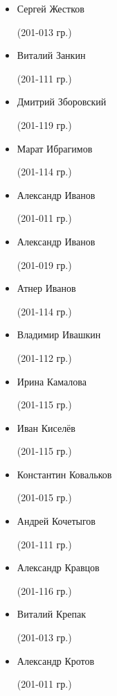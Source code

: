 \begin{multicols}{2}
\begin{small}
\begin{itemize}
	\item[] Сергей Жестков\begin{tiny} (201-013 гр.)\end{tiny}
	\item[] Виталий Занкин\begin{tiny} (201-111 гр.)\end{tiny}
	\item[] Дмитрий Зборовский\begin{tiny} (201-119 гр.)\end{tiny}
	\item[] Марат Ибрагимов\begin{tiny} (201-114 гр.)\end{tiny}
	\item[] Александр Иванов\begin{tiny} (201-011 гр.)\end{tiny}
	\item[] Александр Иванов\begin{tiny} (201-019 гр.)\end{tiny}
	\item[] Атнер Иванов\begin{tiny} (201-114 гр.)\end{tiny}
	\item[] Владимир Ивашкин\begin{tiny} (201-112 гр.)\end{tiny}
	\item[] Ирина Камалова\begin{tiny} (201-115 гр.)\end{tiny}
	\item[] Иван Киселёв\begin{tiny} (201-115 гр.)\end{tiny}
	\item[] Константин Ковальков\begin{tiny} (201-015 гр.)\end{tiny}
	\item[] Андрей Кочетыгов\begin{tiny} (201-111 гр.)\end{tiny}
	\item[] Александр Кравцов\begin{tiny} (201-116 гр.)\end{tiny}
	\item[] Виталий Крепак\begin{tiny} (201-013 гр.)\end{tiny}
	\item[] Александр Кротов\begin{tiny} (201-011 гр.)\end{tiny}

\end{itemize}
\end{small}
\end{multicols}
